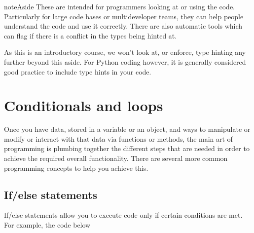 \documentclass[letterpaper,10pt,british]{sphinxmanual}
\begin{document}
\begin{sphinxadmonition}{note}{Aside}
\sphinxAtStartPar
These  are intended for programmers looking at or using the code. Particularly for large code bases or multi\sphinxhyphen{}developer teams, they can help people understand the code and use it correctly. There are also automatic tools which can flag if there is a conflict in the types being hinted at.

\sphinxAtStartPar
As this is an introductory course, we won’t look at, or enforce, type hinting any further beyond this aside. For Python coding however, it is generally considered good practice to include type hints in your code.
\end{sphinxadmonition}

\sphinxstepscope


\section{Conditionals and loops}
\label{\detokenize{chapters/programming_fundamentals/conditionals_and_loops:conditionals-and-loops}}\label{\detokenize{chapters/programming_fundamentals/conditionals_and_loops::doc}}
\sphinxAtStartPar
Once you have data, stored in a variable or an object, and ways to manipulate or modify or interact with that data via functions or methods, the main art of programming is plumbing together the different steps that are needed in order to achieve the required overall functionality. There are several more common programming concepts to help you achieve this.


\subsection{If/else statements}
\label{\detokenize{chapters/programming_fundamentals/conditionals_and_loops:if-else-statements}}
\sphinxAtStartPar
If/else statements allow you to execute code only if certain conditions are met. For example, the code below

\begin{sphinxVerbatim}[commandchars=\\\{\}]
  
  
   
      
   
      
      
\end{sphinxVerbatim}
\end{document}

